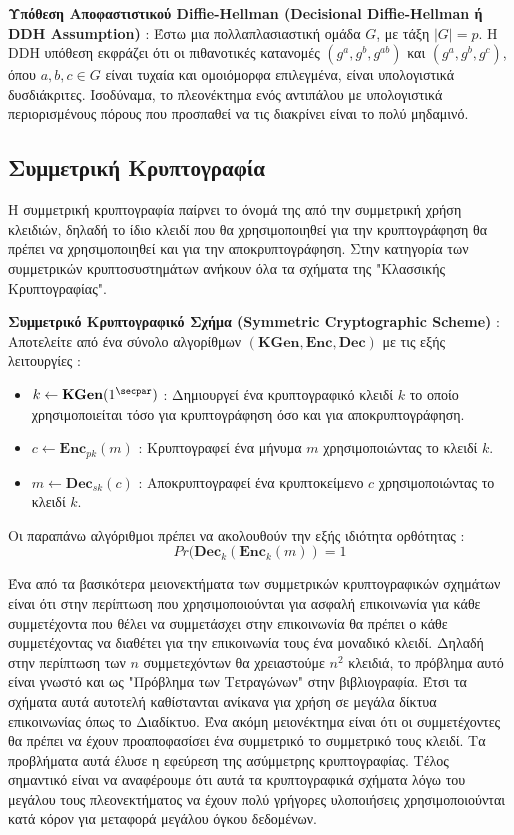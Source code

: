 \begin{definition}
\textbf{Υπόθεση Αποφαστιστικού Diffie-Hellman (Decisional Diffie-Hellman ή DDH Assumption)} :
Έστω μια πολλαπλασιαστική ομάδα $G$, με τάξη $|G|=p$. Η DDH υπόθεση εκφράζει ότι οι πιθανοτικές κατανομές $(g^{a},g^{b},g^{ab})$ και $(g^{a},g^{b},g^{c})$, όπου $a, b, c \in G$ είναι τυχαία και ομοιόμορφα επιλεγμένα, είναι υπολογιστικά δυσδιάκριτες. Ισοδύναμα, το πλεονέκτημα ενός αντιπάλου με υπολογιστικά περιορισμένους πόρους που προσπαθεί να τις διακρίνει είναι το πολύ μηδαμινό.
\end{definition}

\subsection{Συμμετρική Κρυπτογραφία}

Η συμμετρική κρυπτογραφία παίρνει το όνομά της από την συμμετρική χρήση κλειδιών, δηλαδή το ίδιο κλειδί που θα χρησιμοποιηθεί για την κρυπτογράφηση θα πρέπει να χρησιμοποιηθεί και για την αποκρυπτογράφηση. Στην κατηγορία των συμμετρικών κρυπτοσυστημάτων ανήκουν όλα τα σχήματα της "Κλασσικής Κρυπτογραφίας".

\begin{definition}
\textbf{Συμμετρικό Κρυπτογραφικό Σχήμα (Symmetric Cryptographic Scheme)} : Αποτελείτε από ένα σύνολο αλγορίθμων $(\textbf{KGen}, \textbf{Enc}, \textbf{Dec})$ με τις εξής λειτουργίες :
\begin{itemize}
    \item $k \leftarrow \textbf{KGen}(1^\secpar)$ : Δημιουργεί ένα κρυπτογραφικό κλειδί $k$ το οποίο χρησιμοποιείται τόσο για κρυπτογράφηση όσο και για αποκρυπτογράφηση.
    \item $c \leftarrow \textbf{Enc}_{pk}(m)$ : Κρυπτογραφεί ένα μήνυμα $m$ χρησιμοποιώντας το κλειδί $k$.
    \item $m \leftarrow \textbf{Dec}_{sk}(c)$ : Αποκρυπτογραφεί ένα κρυπτοκείμενο $c$ χρησιμοποιώντας το κλειδί $k$.
\end{itemize}
Οι παραπάνω αλγόριθμοι πρέπει να ακολουθούν την εξής ιδιότητα ορθότητας :
$$
    Pr(\textbf{Dec}_{k}(\textbf{Enc}_{k}(m)) = 1
$$
\end{definition}

Ένα από τα βασικότερα μειονεκτήματα των συμμετρικών κρυπτογραφικών σχημάτων είναι ότι στην περίπτωση που χρησιμοποιούνται για ασφαλή επικοινωνία για κάθε συμμετέχοντα που θέλει να συμμετάσχει στην επικοινωνία θα πρέπει ο κάθε συμμετέχοντας να διαθέτει για την επικοινωνία τους ένα μοναδικό κλειδί. Δηλαδή στην περίπτωση των $n$ συμμετεχόντων θα χρειαστούμε $n^2$ κλειδιά, το πρόβλημα αυτό είναι γνωστό και ως "Πρόβλημα των Τετραγώνων" στην βιβλιογραφία. Έτσι τα σχήματα αυτά αυτοτελή καθίστανται ανίκανα για χρήση σε μεγάλα δίκτυα επικοινωνίας όπως το Διαδίκτυο. Ένα ακόμη μειονέκτημα είναι ότι οι συμμετέχοντες θα πρέπει να έχουν προαποφασίσει ένα συμμετρικό το συμμετρικό τους κλειδί. Τα προβλήματα αυτά έλυσε η εφεύρεση της ασύμμετρης κρυπτογραφίας. Τέλος σημαντικό είναι να αναφέρουμε ότι αυτά τα κρυπτογραφικά σχήματα λόγω του μεγάλου τους πλεονεκτήματος να έχουν πολύ γρήγορες υλοποιήσεις χρησιμοποιούνται κατά κόρον για μεταφορά μεγάλου όγκου δεδομένων.

